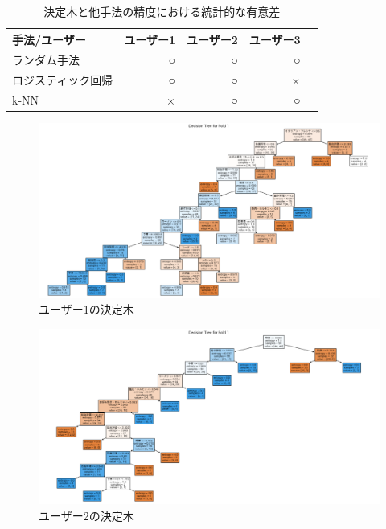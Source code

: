 \documentclass[12pt,a4j]{jreport}
\begin{document}
\begin{table}[htbp]
  \begin{center}
    \begin{tabular}{|l|r|r|r|r|}\hline
      \textbf{手法/ユーザー} & ユーザー1 & ユーザー2 & ユーザー3 \\ \hline
      ランダム手法       & ○        & ○        & ○  \\ \hline
      ロジスティック回帰       & ○        & ○        & × \\ \hline
      k-NN       & ×       & ○        & ○       \\ \hline
    \end{tabular}
  \end{center}
  \caption{決定木と他手法の精度における統計的な有意差}
  \label{Significant_difference_table}
\end{table}

\begin{figure}[htbp]
  \begin{center}
    \includegraphics[width=14cm]{image/fig4.png}
    \caption{ユーザー1の決定木}
    \label{fig4}
  \end{center}
\end{figure}

\begin{figure}[htbp]
  \begin{center}
    \includegraphics[width=14cm]{image/fig5.png}
    \caption{ユーザー2の決定木}
    \label{fig5}
  \end{center}
\end{figure}
\end{document}
